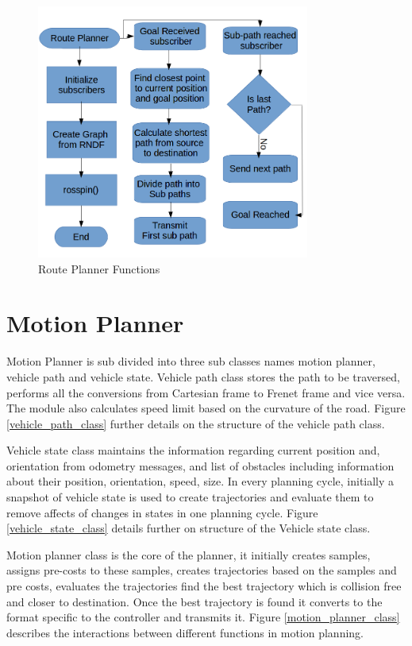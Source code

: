 \begin{figure}
	\centering
	\includegraphics[width=0.8\textwidth]{Images/implementation/route_planner.png}
	\caption{Route Planner Functions}
	\label{route_planner_func}
\end{figure}

\section{Motion Planner}
Motion Planner is sub divided into three sub classes names motion planner, vehicle path and vehicle state. Vehicle path class stores the path to be traversed, performs all the conversions from Cartesian frame to Frenet frame and vice versa. The module also calculates speed limit based on the curvature of the road. Figure \ref{vehicle_path_class} further details on the structure of the vehicle path class. 

Vehicle state class maintains the information regarding current position and, orientation from odometry messages, and list of obstacles including information about their position, orientation, speed, size. In every planning cycle, initially a snapshot of vehicle state is used to create trajectories and evaluate them to remove affects of changes in states in one planning cycle. Figure \ref{vehicle_state_class} details further on structure of the Vehicle state class. 


Motion planner class is the core of the planner, it initially creates samples, assigns pre-costs to these samples, creates trajectories based on the samples and pre costs, evaluates the trajectories find the best trajectory which is collision free and closer to destination. Once the best trajectory is found it converts to the format specific to the controller and transmits it. Figure \ref{motion_planner_class} describes the interactions between different functions in motion planning.


